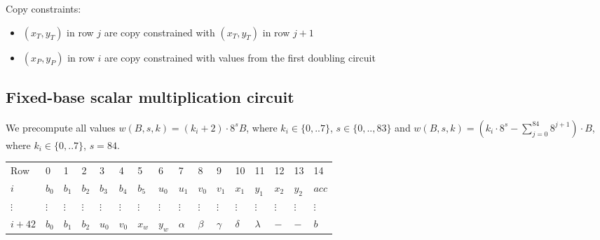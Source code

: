     Copy constraints:
    \begin{itemize}
    \item $(x_T,y_T)$ in row $j$ are copy constrained with $(x_T,y_T)$ in row $j + 1$ 
    \item $(x_P,y_P)$ in row $i$ are copy constrained with values from the first doubling circuit
    \end{itemize}

\subsection{Fixed-base scalar multiplication circuit}
We precompute all values $w(B,s,k) = (k_i + 2) \cdot 8^s B$, where $k_i \in \{ 0,..7 \}$, $s \in \{0,.., 83\}$ and  $w(B,s,k) = (k_i \cdot 8^s - \sum_{j = 0}^{84} 8^{j + 1}) \cdot B$, where $k_i \in \{ 0,..7 \}$, $s = 84$.
\begin{center}
    \begin{table}[H]
        \begin{tabular}{llllllllllllllll}
            Row        & 0        & 1        & 2        & 3        & 4        & 5        & 6        & 7        & 8        & 9        & 10       & 11        & 12       & 13       & 14       \\
            $i$      & $b_0$    & $b_1$    & $b_2$    & $b_3$    & $b_4$    & $b_5$    & $u_0$    & $u_1$    & $v_0$    & $v_1$    & $x_1$    & $y_1$     & $x_2$ & $y_2$ & $acc$ \\
            $\vdots$  & $\vdots$ & $\vdots$ & $\vdots$ & $\vdots$ & $\vdots$ & $\vdots$ & $\vdots$ & $\vdots$ & $\vdots$ & $\vdots$ & $\vdots$ & $\vdots$ & $\vdots$ & $\vdots$ & $\vdots$ \\
            $i + 42$ & $b_0$    & $b_1$    & $b_2$    & $u_0$    & $v_0$    & $x_w$    & $y_w$    & $\alpha$ & $\beta$  & $\gamma$ & $\delta$ & $\lambda$ & $-$ & $-$ & $b$ \\
        \end{tabular}
    \end{table}
\end{center}

